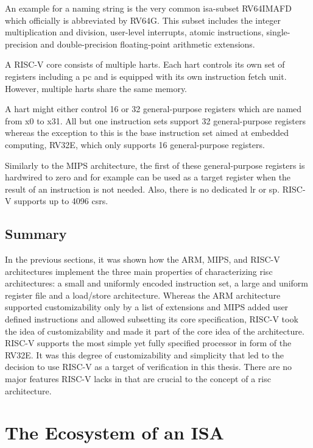 An example for a naming string is the very common \gls{isa}-subset RV64IMAFD which officially is abbreviated by RV64G.
This subset includes the integer multiplication and division, user-level interrupts, atomic instructions, single-precision and double-precision floating-point arithmetic extensions.

A RISC-V core consists of multiple \glspl{hart}.
Each \gls{hart} controls its own set of registers including a \gls{pc} and is equipped with its own instruction fetch unit.
However, multiple \glspl{hart} share the same memory.

A \gls{hart} might either control 16 or 32 general-purpose registers which are named from x0 to x31.
All but one instruction sets support 32 general-purpose registers whereas the exception to this is the base instruction set aimed at embedded computing, RV32E, which only supports 16 general-purpose registers.

Similarly to the MIPS architecture, the first of these general-purpose registers is hardwired to zero and for example can be used as a target register when the result of an instruction is not needed.
Also, there is no dedicated \gls{lr} or \gls{sp}.
RISC-V supports up to 4096 \glspl{csr}.

\subsection{Summary}

In the previous sections, it was shown how the ARM, MIPS, and RISC-V architectures implement the three main properties of \cite{Hennessy12} characterizing \gls{risc} architectures: a small and uniformly encoded instruction set, a large and uniform register file and a load/store architecture.
Whereas the ARM architecture supported customizability only by a list of extensions and MIPS added user defined instructions and allowed subsetting its core specification, RISC-V took the idea of customizability and made it part of the core idea of the architecture.
RISC-V supports the most simple yet fully specified processor in form of the RV32E.
It was this degree of customizability and simplicity that led to the decision to use RISC-V as a target of verification in this thesis.
There are no major features RISC-V lacks in that are crucial to the concept of a \gls{risc} architecture.

\section{The Ecosystem of an ISA}
\label{sec:ecosystem}

